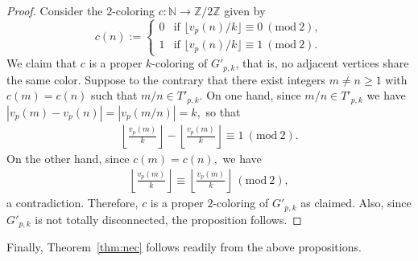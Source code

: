 \documentclass[12pt, reqno, a4paper]{amsart}
\theoremstyle{definition}
\theoremstyle{remark}
\numberwithin{equation}{section}
\newcommand{\Mod}[1]{\ (\mathrm{mod}\ #1)}
\newcommand{\N}{\mathbb{N}}
\renewcommand{\geq}{\geqslant}
\begin{document}
\begin{proof}
Consider the $2$-coloring $c:\N\to \mathbb{Z}/2\mathbb{Z}$ given by 
  \[ c(n) := \begin{cases}
      0 &\text{if } \lfloor v_{p}(n)/k \rfloor \equiv 0 \Mod{2},\\
      1 &\text{if } \lfloor v_{p}(n)/k \rfloor \equiv 1 \Mod{2}.
  \end{cases} \]
  We claim that $c$ is a proper $k$-coloring of $G'_{p,k}$, that is, no adjacent vertices share the same color. Suppose to the contrary that there exist integers $m \neq n \geq 1$ with $c(m)=c(n)$ such that 
$m/n \in T'_{p,k}.$ On one hand, since $m/n \in T'_{p,k}$ we have 
$|v_p(m)-v_p(n)|=|v_p(m/n)|=k,$ so that
\begin{align*}
\left\lfloor \frac{v_p(m)}{k} \right\rfloor - \left\lfloor \frac{v_p(m)}{k} \right\rfloor  \equiv  1 \Mod{2}.
\end{align*}
On the other hand, since $c(m)=c(n),$ we have 
\begin{align*}
\left\lfloor \frac{v_p(m)}{k} \right\rfloor \equiv  \left\lfloor \frac{v_p(m)}{k} \right\rfloor  \Mod{2},
\end{align*}
a contradiction. Therefore,  $c$ is a proper $2$-coloring of $G'_{p,k}$ as claimed. Also, since $G'_{p,k}$ is not totally disconnected, the proposition follows.
\end{proof}

Finally, Theorem~\ref{thm:nec} follows readily from the above propositions.
\end{document}
